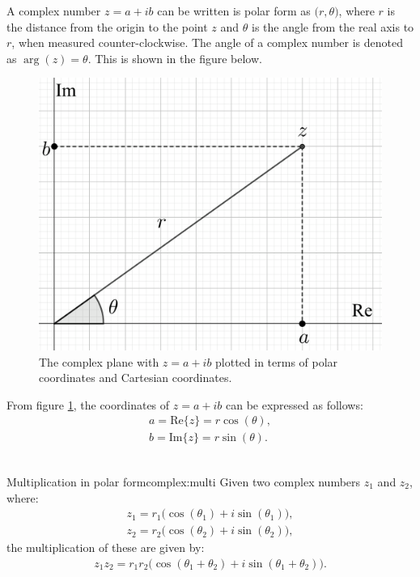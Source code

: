 \noindent A complex number $z=a+ib$ can be written is polar form as $\big(r,\theta\big)$, where $r$ is the distance from the origin to the point $z$ and $\theta$ is the angle from the real axis to $r$, when measured counter-clockwise. The angle of a complex number is denoted as $\arg(z)=\theta$. This is shown in the figure below.
\begin{figure}[H] 
\centering
\includegraphics[scale=0.15]{fig/img/complex_plan_polar}
\caption{The complex plane with $z=a+ib$ plotted in terms of polar coordinates and Cartesian coordinates.}
\label{fig:complex_plane_polar}
\end{figure}
\noindent
From figure \ref{fig:complex_plane_polar}, the coordinates of $z=a+ib$ can be expressed as follows:
\begin{align}
a=\text{Re}\{z\}=r\cos(\theta),
\\
b=\text{Im}\{z\}=r\sin(\theta).
\end{align}
\\

\begin{theorem}{Multiplication in polar form}{complex:multi}
Given two complex numbers $z_1$ and $z_2$, where:
\begin{align*}
z_1=r_1\big( \cos(\theta_1)+i\sin(\theta_1) \big), 
\\
z_2=r_2\big( \cos(\theta_2)+i\sin(\theta_2) \big),
\end{align*}
the multiplication of these are given by:
\begin{align}
z_1 z_2=r_1r_2\big( \cos(\theta_1+\theta_2)+ i \sin(\theta_1+\theta_2)\big). \label{pol:trig}
\end{align}
\end{theorem}


